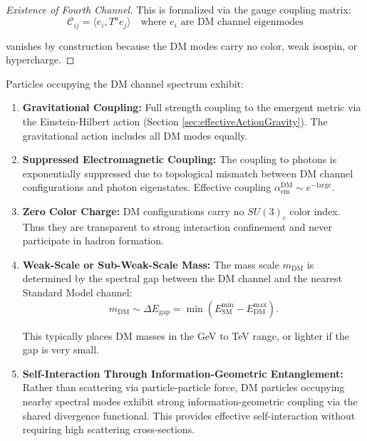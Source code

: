 \begin{theorem}
\begin{proof}[Existence of Fourth Channel]
This is formalized via the gauge coupling matrix:
\begin{equation}
\mathcal{C}_{ij} = \langle e_i, T^a e_j \rangle \quad \text{where } e_i \text{ are DM channel eigenmodes}
\end{equation}

vanishes by construction because the DM modes carry no color, weak isospin, or hypercharge.

\end{proof}

\end{theorem}

\begin{lemma}
\label{lem:DMProperties}

Particles occupying the DM channel spectrum exhibit:

\begin{enumerate}

\item \textbf{Gravitational Coupling:} Full strength coupling to the emergent metric via the Einstein-Hilbert action (Section \ref{sec:effectiveActionGravity}). The gravitational action includes all DM modes equally.

\item \textbf{Suppressed Electromagnetic Coupling:} The coupling to photons is exponentially suppressed due to topological mismatch between DM channel configurations and photon eigenstates. Effective coupling $\alpha_{\text{em}}^{\text{DM}} \sim e^{-\text{large}}$.

\item \textbf{Zero Color Charge:} DM configurations carry no $SU(3)_c$ color index. Thus they are transparent to strong interaction confinement and never participate in hadron formation.

\item \textbf{Weak-Scale or Sub-Weak-Scale Mass:} The mass scale $m_{\text{DM}}$ is determined by the spectral gap between the DM channel and the nearest Standard Model channel:
\begin{equation}
m_{\text{DM}} \sim \Delta E_{\text{gap}} = \min(E_{\text{SM}}^{\text{min}} - E_{\text{DM}}^{\max}).
\end{equation}

This typically places DM masses in the GeV to TeV range, or lighter if the gap is very small.

\item \textbf{Self-Interaction Through Information-Geometric Entanglement:} Rather than scattering via particle-particle force, DM particles occupying nearby spectral modes exhibit strong information-geometric coupling via the shared divergence functional. This provides effective self-interaction without requiring high scattering cross-sections.


\end{enumerate}
\end{lemma}
